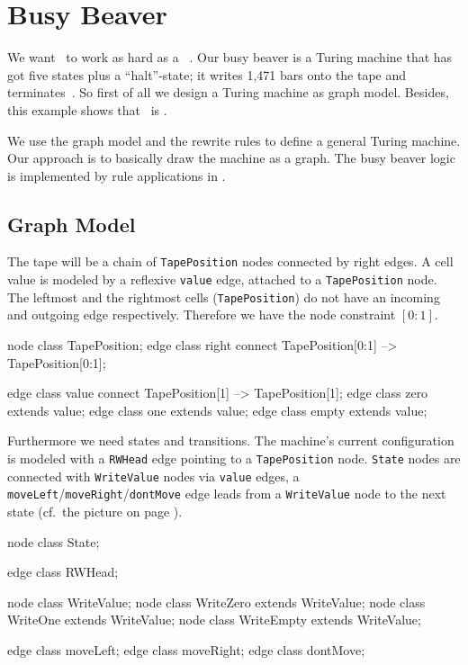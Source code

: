 \section{Busy Beaver}
We want \GrG\ to work as hard as a ~\cite{Kro:07,Dew:84}. Our busy beaver is a Turing machine that has got five states plus a ``halt''-state; it writes 1,471 bars onto the tape and terminates~\cite{MB:00}. So first of all we design a Turing machine as graph model. Besides, this example shows that \GrG\ is .

We use the graph model and the rewrite rules to define a general Turing machine. Our approach is to basically draw the machine as a graph. The busy beaver logic is implemented by rule applications in \GrShell.

\subsection{Graph Model}
The tape will be a chain of \texttt{TapePosition} nodes connected by right edges. A cell value is modeled by a reflexive \texttt{value} edge, attached to a \texttt{TapePosition} node. The leftmost and the rightmost cells (\texttt{TapePosition}) do not have an incoming and outgoing edge respectively. Therefore we have the node constraint $[0:1]$.
\begin{grgen}[firstnumber=last]
node class TapePosition;
edge class right
  connect TapePosition[0:1] --> TapePosition[0:1];

edge class value
  connect TapePosition[1] --> TapePosition[1];
edge class zero  extends value;
edge class one   extends value;
edge class empty extends value;

\end{grgen}
Furthermore we need states and transitions.
The machine's current configuration is modeled with a \texttt{RWHead} edge pointing to a \texttt{TapePosition} node.
\texttt{State} nodes are connected with \texttt{WriteValue} nodes via \texttt{value} edges, a \texttt{moveLeft}/\texttt{moveRight}/\texttt{dontMove} edge leads from a \texttt{WriteValue} node to the next state (cf.~the picture on page \pageref{fig:bbstart}).
\begin{grgen}[firstnumber=last]
node class State;

edge class RWHead;

node class WriteValue;
node class WriteZero extends WriteValue;
node class WriteOne extends WriteValue;
node class WriteEmpty extends WriteValue;

edge class moveLeft;
edge class moveRight;
edge class dontMove;
\end{grgen}


